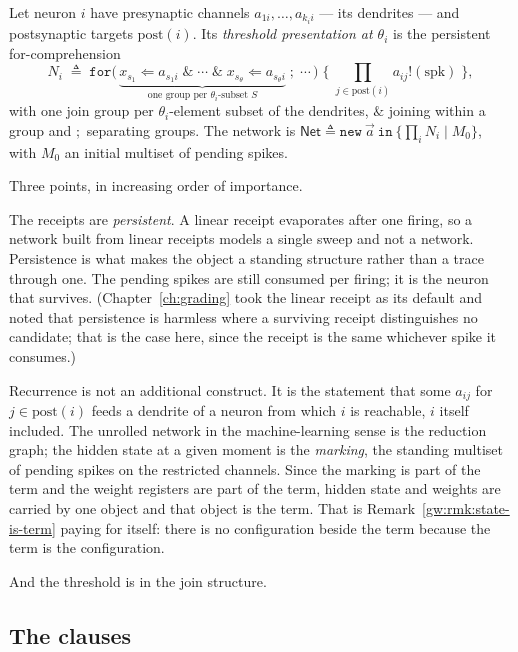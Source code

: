 \begin{definition}[Neuron]
\label{spk:def:neuron}
Let neuron $i$ have presynaptic channels $a_{1i}, \ldots, a_{k_i i}$ --- its dendrites ---
and postsynaptic targets $\mathrm{post}(i)$. Its \emph{threshold presentation at
$\theta_i$} is the persistent for-comprehension
\[
  N_i \;\triangleq\;
  \texttt{for}\bigl(\,
    \underbrace{x_{s_1} \Leftarrow a_{s_1 i} \;\&\; \cdots \;\&\; x_{s_\theta} \Leftarrow a_{s_\theta i}}
    _{\text{one group per }\theta_i\text{-subset } S}
  \;;\; \cdots \,\bigr)
  \;\bigl\{\; \textstyle\prod_{j \in \mathrm{post}(i)} a_{ij}!(\mathrm{spk}) \;\bigr\},
\]
with one join group per $\theta_i$-element subset of the dendrites, $\&$ joining within a
group and $;$ separating groups. The network is
$\mathsf{Net} \triangleq \texttt{new}\ \vec{a}\ \texttt{in}\ \{\prod_i N_i \mid M_0\}$,
with $M_0$ an initial multiset of pending spikes.
\end{definition}

Three points, in increasing order of importance.

The receipts are \emph{persistent}. A linear receipt evaporates after one firing, so a
network built from linear receipts models a single sweep and not a network. Persistence
is what makes the object a standing structure rather than a trace through one. The
pending spikes are still consumed per firing; it is the neuron that survives.
(Chapter~\ref{ch:grading} took the linear receipt as its default and noted that
persistence is harmless where a surviving receipt distinguishes no candidate; that is the
case here, since the receipt is the same whichever spike it consumes.)

Recurrence is not an additional construct. It is the statement that some $a_{ij}$ for
$j \in \mathrm{post}(i)$ feeds a dendrite of a neuron from which $i$ is reachable, $i$
itself included. The unrolled network in the machine-learning sense is the reduction
graph; the hidden state at a given moment is the \emph{marking}, the standing multiset of
pending spikes on the restricted channels. Since the marking is part of the term and the
weight registers are part of the term, hidden state and weights are carried by one object
and that object is the term. That is Remark~\ref{gw:rmk:state-is-term} paying for
itself: there is no configuration beside the term because the term is the configuration.

And the threshold is in the join structure.

\subsection{The clauses}

